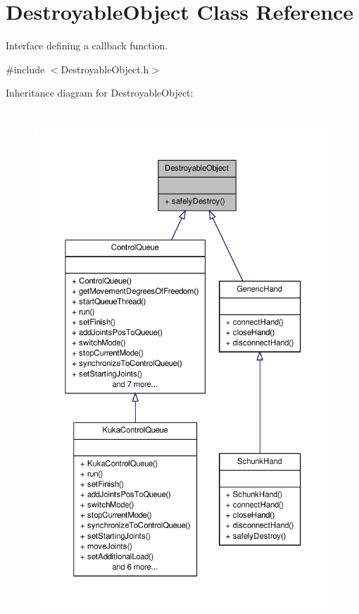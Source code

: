 \hypertarget{classDestroyableObject}{\section{\-Destroyable\-Object \-Class \-Reference}
\label{classDestroyableObject}
}


\-Interface defining a callback function.  




{\ttfamily \#include $<$\-Destroyable\-Object.\-h$>$}



\-Inheritance diagram for \-Destroyable\-Object\-:\nopagebreak
\begin{figure}[H]
\begin{center}
\leavevmode
\includegraphics[height=550pt]{classDestroyableObject__inherit__graph}
\end{center}
\end{figure}
